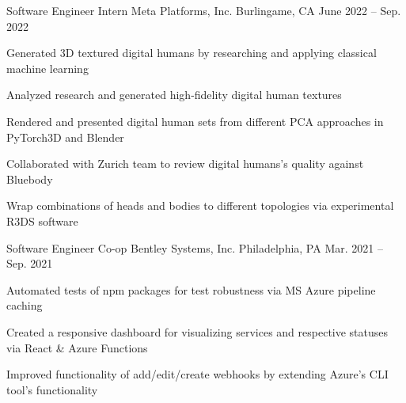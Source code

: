 

\begin{cventries}
  \cventry
  {Software Engineer Intern} %
  {Meta Platforms, Inc.} %
  {Burlingame, CA} %
  {June 2022 -- Sep. 2022} %
  {
    \begin{cvitems} %
      \item {Generated 3D textured digital humans by researching and applying classical machine learning}
      \item {Analyzed research and generated high-fidelity digital human textures}
      \item {Rendered and presented digital human sets from different PCA approaches in PyTorch3D and Blender}
      \item {Collaborated with Zurich team to review digital humans's quality against Bluebody}
      \item {Wrap combinations of heads and bodies to different topologies via experimental R3DS software}
    \end{cvitems}
  }

  \cventry
  {Software Engineer Co-op} %
  {Bentley Systems, Inc.} %
  {Philadelphia, PA} %
  {Mar. 2021 -- Sep. 2021} %
  {
    \begin{cvitems} %
      \item {Automated tests of npm packages for test robustness via MS Azure pipeline caching}
      \item {Created a responsive dashboard for visualizing services and respective statuses via React \& Azure Functions}
      \item {Improved functionality of add/edit/create webhooks by extending Azure's CLI tool's functionality}
    \end{cvitems}
  }


\end{cventries}
